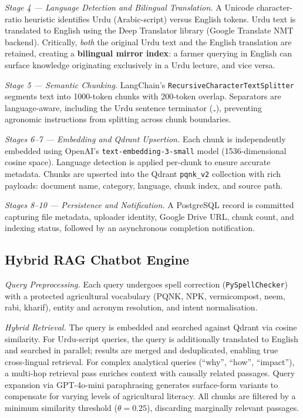 \documentclass[conference]{IEEEtran}
\begin{document}
\textit{Stage 4 — Language Detection and Bilingual Translation.}
A Unicode character-ratio heuristic identifies Urdu (Arabic-script) versus English tokens.
Urdu text is translated to English using the Deep Translator library (Google Translate NMT
backend). Critically, \textit{both} the original Urdu text and the English translation are
retained, creating a \textbf{bilingual mirror index}: a farmer querying in English can
surface knowledge originating exclusively in a Urdu lecture, and vice versa.

\textit{Stage 5 — Semantic Chunking.}
LangChain's \texttt{RecursiveCharacterTextSplitter} segments text into 1000-token chunks
with 200-token overlap. Separators are language-aware, including the Urdu sentence
terminator (۔), preventing agronomic instructions from splitting across chunk boundaries.

\textit{Stages 6--7 — Embedding and Qdrant Upsertion.}
Each chunk is independently embedded using OpenAI's \texttt{text-embedding-3-small} model
(1536-dimensional cosine space). Language detection is applied per-chunk to ensure accurate
metadata. Chunks are upserted into the Qdrant \texttt{pqnk\_v2} collection with rich
payloads: document name, category, language, chunk index, and source path.

\textit{Stages 8--10 — Persistence and Notification.}
A PostgreSQL record is committed capturing file metadata, uploader identity, Google Drive URL,
chunk count, and indexing status, followed by an asynchronous completion notification.

\subsection{Hybrid RAG Chatbot Engine}

\textit{Query Preprocessing.}
Each query undergoes spell correction (\texttt{PySpellChecker}) with a protected agricultural
vocabulary (PQNK, NPK, vermicompost, neem, rabi, kharif), entity and acronym resolution,
and intent normalisation.

\textit{Hybrid Retrieval.}
The query is embedded and searched against Qdrant via cosine similarity. For Urdu-script
queries, the query is additionally translated to English and searched in parallel;
results are merged and deduplicated, enabling true cross-lingual retrieval. For complex
analytical queries (``why'', ``how'', ``impact''), a multi-hop retrieval pass enriches
context with causally related passages. Query expansion via GPT-4o-mini paraphrasing
generates surface-form variants to compensate for varying levels of agricultural literacy.
All chunks are filtered by a minimum similarity threshold ($\theta = 0.25$), discarding
marginally relevant passages.
\end{document}

